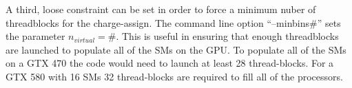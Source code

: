 A third, loose constraint can be set in order to force a minimum nuber of threadblocks for the charge-assign. The command line option ``--minbins\#'' sets the parameter $n_{virtual} = \#$. This is useful in ensuring that enough threadblocks are launched to populate all of the SMs on the GPU. To populate all of the SMs on a GTX 470 the code would need to launch at least 28 thread-blocks. For a GTX 580 with 16 SMs 32 thread-blocks are required to fill all of the processors.  



